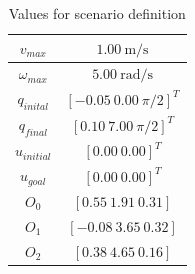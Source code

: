 \begin{table}[!h]
\caption {Values for scenario definition} \label{tab:s3param}
\begin{center}
\begin{tabular}{|c|c|}
\hline
$v_{max}$ & $1.00\ \mathrm{m/s}$\\
\hline
$\omega_{max}$ & $5.00\ \mathrm{rad/s}$\\
\hline
$q_{inital}$ & $[-0.05\ 0.00\ \pi/2]^T$\\
\hline
$q_{final}$ & $[0.10\ 7.00\ \pi/2]^T$\\
\hline
$u_{initial}$ & $[0.00\ 0.00]^T$\\
\hline
$u_{goal}$ & $[0.00\ 0.00]^T$\\
\hline
$O_0$ & $[0.55\ 1.91\ 0.31]$\\
\hline
$O_1$ & $[-0.08\ 3.65\ 0.32]$\\
\hline
$O_2$ & $[0.38\ 4.65\ 0.16]$\\
\hline
\end{tabular}
\end{center}
\end{table}
